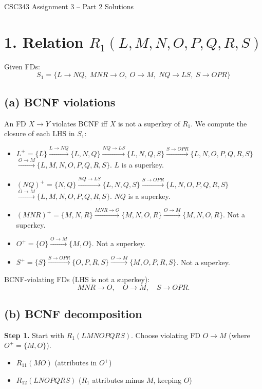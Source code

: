 \documentclass[11pt]{article}
\begin{document}
\begin{center}
{\Large CSC343 Assignment 3 -- Part 2 Solutions}
\end{center}

\section*{1. Relation $R_1(L,M,N,O,P,Q,R,S)$}
Given FDs:
\[
S_1 = \{L \to NQ,\; MNR \to O,\; O \to M,\; NQ \to LS,\; S \to OPR\}
\]

\subsection*{(a) BCNF violations}

An FD $X \to Y$ violates BCNF iff $X$ is not a superkey of $R_1$.
We compute the closure of each LHS in $S_1$:
\begin{itemize}
\item $L^+ = \{L\}
  \xrightarrow{L \to NQ} \{L,N,Q\}
  \xrightarrow{NQ \to LS} \{L,N,Q,S\}
  \xrightarrow{S \to OPR} \{L,N,O,P,Q,R,S\}$\\
  $\xrightarrow{O \to M} \{L,M,N,O,P,Q,R,S\}$.
  $L$ is a superkey.
\item $(NQ)^+ = \{N,Q\}
  \xrightarrow{NQ \to LS} \{L,N,Q,S\}
  \xrightarrow{S \to OPR} \{L,N,O,P,Q,R,S\}$\\
  $\xrightarrow{O \to M} \{L,M,N,O,P,Q,R,S\}$.
  $NQ$ is a superkey.
\item $(MNR)^+ = \{M,N,R\}
  \xrightarrow{MNR \to O} \{M,N,O,R\}
  \xrightarrow{O \to M} \{M,N,O,R\}$.
  Not a superkey.
\item $O^+ = \{O\}
  \xrightarrow{O \to M} \{M,O\}$.
  Not a superkey.
\item $S^+ = \{S\}
  \xrightarrow{S \to OPR} \{O,P,R,S\}
  \xrightarrow{O \to M} \{M,O,P,R,S\}$.
  Not a superkey.
\end{itemize}

BCNF-violating FDs (LHS is not a superkey):
\[
MNR \to O,\quad O \to M,\quad S \to OPR.
\]

\subsection*{(b) BCNF decomposition}

\textbf{Step 1.} Start with $R_1(LMNOPQRS)$.
Choose violating FD $O \to M$ (where $O^+ = \{M,O\}$).
\begin{itemize}
\item $R_{11}(MO)$ \quad (attributes in $O^+$)
\item $R_{12}(LNOPQRS)$ \quad ($R_1$ attributes minus $M$, keeping $O$)
\end{itemize}
\end{document}
